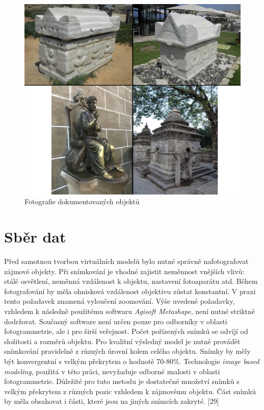\documentclass[a4paper, 12pt]{report}
\begin{document}
\begin{figure}[h!]
	\centering
	\includegraphics[width=14cm]{objekty.jpg}
	\caption{Fotografie dokumentovaných objektů}
\end{figure}


\section{Sběr dat}
Před samotnou tvorbou virtuálních modelů bylo nutné správně nafotografovat zájmové objekty. Při snímkování je vhodné zajistit neměnnost vnějších vlivů: stálé osvětlení, neměnná vzdálenost k objektu, nastavení fotoaparátu atd. Během fotografování by měla ohnisková vzdálenost objektivu zůstat konstantní. V praxi tento požadavek znamená vyloučení zoomování. Výše uvedené požadavky, vzhledem k následně použitému softwaru \textit{Agisoft Metashape}, není nutné striktně dodržovat. Současný software není určen pouze pro odborníky v oblasti fotogrammetrie, ale i pro širší veřejnost. Počet pořízených snímků se odvíjí od složitosti a rozměrů objektu. Pro kvalitní výsledný model je nutné provádět snímkování pravidelně z různých úrovní kolem celého objektu. Snímky by měly být konvergentní s velkým překrytem o hodnotě 70-80\%. Technologie \textit{image based modeling}, použitá v této práci, nevyžaduje odborné znalosti v oblasti fotogrammetrie. Důležité pro tuto metodu je dostatečné množství snímků s velkým překrytem z různých pozic vzhledem k zájmovému objektu. Část snímků by měla obsahovat i části, které jsou na jiných snímcích zakryté. [29]
\end{document}

